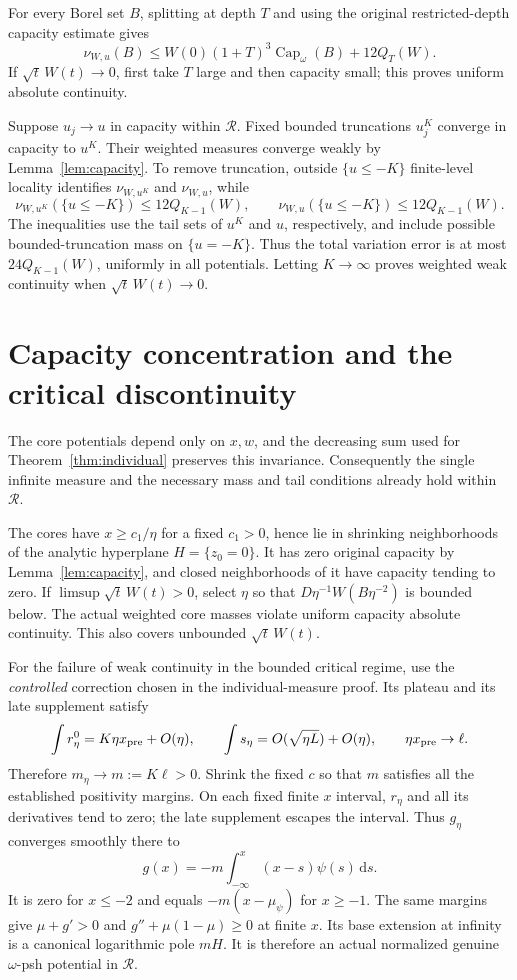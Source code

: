 \documentclass[11pt]{article}
\theoremstyle{remark}
\begin{document}
For every Borel set $B$, splitting at depth $T$ and using the original
restricted-depth capacity estimate gives
\begin{equation}\label{eq:uniform-ac}
 \nu_{W,u}(B)\leq W(0)(1+T)^3\operatorname{Cap}_\omega(B)
                                      +12Q_T(W).
\end{equation}
If $\sqrt t\,W(t)\to0$, first take $T$ large and then capacity small;
this proves uniform absolute continuity.

Suppose $u_j\to u$ in capacity within $\mathcal R$. Fixed bounded
truncations $u_j^K$ converge in capacity to $u^K$. Their weighted
measures converge weakly by Lemma~\ref{lem:capacity}. To remove
truncation, outside $\{u\leq-K\}$ finite-level locality identifies
$\nu_{W,u^K}$ and $\nu_{W,u}$, while
\[
 \nu_{W,u^K}(\{u\leq-K\})\leq12Q_{K-1}(W),\qquad
 \nu_{W,u}(\{u\leq-K\})\leq12Q_{K-1}(W).
\]
The inequalities use the tail sets of $u^K$ and $u$, respectively,
and include possible bounded-truncation mass on $\{u=-K\}$.
Thus the total variation error is at most $24Q_{K-1}(W)$, uniformly
in all potentials. Letting $K\to\infty$ proves weighted weak
continuity when $\sqrt t\,W(t)\to0$.

\section{Capacity concentration and the critical discontinuity}
The core potentials depend only on $x,w$, and the decreasing sum used
for Theorem~\ref{thm:individual} preserves this invariance. Consequently
the single infinite measure and the necessary mass and tail conditions
already hold within $\mathcal R$.

The cores have $x\geq c_1/\eta$ for a fixed $c_1>0$, hence lie in
shrinking neighborhoods of the analytic hyperplane $H=\{z_0=0\}$.
It has zero original capacity by Lemma~\ref{lem:capacity}, and closed
neighborhoods of it have capacity tending to zero. If
$\limsup\sqrt t\,W(t)>0$, select $\eta$ so that
$D\eta^{-1}W(B\eta^{-2})$ is bounded below. The actual weighted
core masses violate uniform capacity absolute continuity. This also
covers unbounded $\sqrt t\,W(t)$.

For the failure of weak continuity in the bounded critical regime,
use the \emph{controlled} correction chosen in the individual-measure
proof. Its plateau and its late supplement satisfy
\[
 \int r^0_\eta=K\eta x_{\rm pre}+O(\eta),\qquad
 \int s_\eta=O(\sqrt{\eta L})+O(\eta),\qquad
 \eta x_{\rm pre}\to\ell.
\]
Therefore $m_\eta\to m:=K\ell>0$. Shrink the fixed $c$ so that $m$
satisfies all the established positivity margins. On each fixed finite
$x$ interval, $r_\eta$ and all its derivatives tend to zero; the late
supplement escapes the interval. Thus $g_\eta$ converges smoothly there to
\[
 g(x)=-m\int_{-\infty}^x(x-s)\psi(s)\,\mathrm ds.
\]
It is zero for $x\leq-2$ and equals $-m(x-\mu_\psi)$ for $x\geq-1$.
The same margins give $\mu+g'>0$ and
$g''+\mu(1-\mu)\geq0$ at finite $x$.
Its base extension at infinity is a canonical logarithmic pole $mH$.
It is therefore an actual normalized genuine $\omega$-psh potential
in $\mathcal R$.
\end{document}
